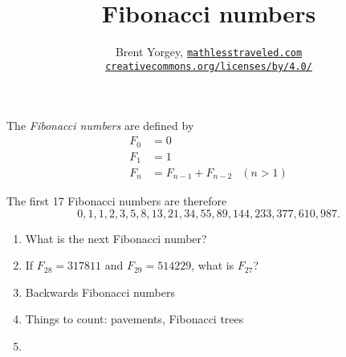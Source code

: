 \documentclass{article}
\title{Fibonacci numbers}
\author{Brent Yorgey, \href{http://www.mathlesstraveled.com}{\texttt{mathlesstraveled.com}} \\ \raisebox{-0.4em}{\texttt{[image: ../CC-BY.png]}} \href{http://creativecommons.org/licenses/by/4.0/}{\texttt{creativecommons.org/licenses/by/4.0/}}}
\begin{document}
\maketitle

\fontsize{16}{20}\selectfont

The \emph{Fibonacci numbers} are defined by
\begin{align*}
  F_0 &= 0 \\
  F_1 &= 1 \\
  F_n &= F_{n-1} + F_{n-2} & (n > 1)
\end{align*}

The first 17 Fibonacci numbers are therefore \[
  0,1,1,2,3,5,8,13,21,34,55,89,144,233,377,610,987. \]

\begin{enumerate}
  \item What is the next Fibonacci number?  \vspace{1in}
  \item If $F_{28} = 317811$ and $F_{29} = 514229$, what is $F_{27}$?
  \item Backwards Fibonacci numbers
  \item Things to count: pavements, Fibonacci trees
\item\end{enumerate}
\end{document}
